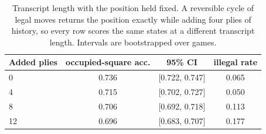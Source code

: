 \begin{table}[t]
\centering\small
\caption{Transcript length with the position held fixed. A reversible
cycle of legal moves returns the position exactly while adding four plies
of history, so every row scores the same states at a different transcript
length. Intervals are bootstrapped over games.}
\label{tab:cycles}
\begin{tabular}{lccc}
\toprule
Added plies & occupied-square acc. & 95\% CI & illegal rate \\
\midrule
0 & 0.736 & [0.722, 0.747] & 0.065 \\
4 & 0.715 & [0.702, 0.727] & 0.050 \\
8 & 0.706 & [0.692, 0.718] & 0.113 \\
12 & 0.696 & [0.683, 0.707] & 0.177 \\
\bottomrule
\end{tabular}
\end{table}
